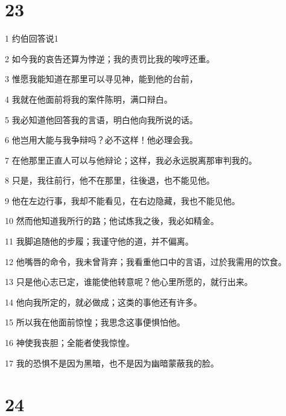 \chapter{23}

\par 1 约伯回答说1
\par 2 如今我的哀告还算为悖逆；我的责罚比我的唉哼还重。
\par 3 惟愿我能知道在那里可以寻见神，能到他的台前，
\par 4 我就在他面前将我的案件陈明，满口辩白。
\par 5 我必知道他回答我的言语，明白他向我所说的话。
\par 6 他岂用大能与我争辩吗？必不这样！他必理会我。
\par 7 在他那里正直人可以与他辩论；这样，我必永远脱离那审判我的。
\par 8 只是，我往前行，他不在那里，往後退，也不能见他。
\par 9 他在左边行事，我却不能看见，在右边隐藏，我也不能见他。
\par 10 然而他知道我所行的路；他试炼我之後，我必如精金。
\par 11 我脚追随他的步履；我谨守他的道，并不偏离。
\par 12 他嘴唇的命令，我未曾背弃；我看重他口中的言语，过於我需用的饮食。
\par 13 只是他心志已定，谁能使他转意呢？他心里所愿的，就行出来。
\par 14 他向我所定的，就必做成；这类的事他还有许多。
\par 15 所以我在他面前惊惶；我思念这事便惧怕他。
\par 16 神使我丧胆；全能者使我惊惶。
\par 17 我的恐惧不是因为黑暗，也不是因为幽暗蒙蔽我的脸。

\chapter{24}

